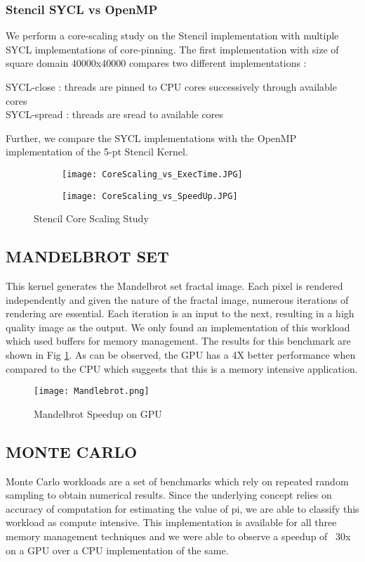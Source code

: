 \documentclass[14pt,fleqn]{article}
\begin{document}
\subsubsection{Stencil SYCL vs OpenMP}
We perform a core-scaling study on the Stencil implementation with multiple SYCL implementations of core-pinning. The first implementation with size of square domain 40000x40000 compares two different implementations :

SYCL-close : threads are pinned to CPU cores successively through available cores \\
SYCL-spread : threads are sread to available cores

Further, we compare the SYCL implementations with the OpenMP implementation of the 5-pt Stencil Kernel.

\begin{figure}
\begin{subfigure}{.5\textwidth}
    \texttt{[image: CoreScaling\_vs\_ExecTime.JPG]}
\end{subfigure}%
\begin{subfigure}{.5\textwidth}
    \texttt{[image: CoreScaling\_vs\_SpeedUp.JPG]}
\end{subfigure}%
    \caption{Stencil Core Scaling Study}
\end{figure}

\subsection{MANDELBROT SET}
This kernel generates the Mandelbrot set fractal image. Each pixel is rendered independently and given the nature of the fractal image, numerous iterations of rendering are essential. Each iteration is an input to the next, resulting in a high quality image as the output. We only found an implementation of this workload which used buffers for memory management. The results for this benchmark are shown in Fig \ref{fig:Mandlebrot}. As can be observed, the GPU has a 4X better performance when compared to the CPU which suggests that this is a memory intensive application.
\begin{figure}
\centering
    \texttt{[image: Mandlebrot.png]}
    \caption{Mandelbrot Speedup on GPU}
    \label{fig:Mandlebrot}
\end{figure}
\subsection{MONTE CARLO}
Monte Carlo workloads are a set of benchmarks which rely on repeated random sampling to obtain numerical results. Since the underlying concept relies on accuracy of computation for estimating the value of pi, we are able to classify this workload as compute intensive. This implementation is available for all three memory management techniques and we were able to observe a speedup of ~30x on a GPU over a CPU implementation of the same. \\\\\\\\\
\end{document}
